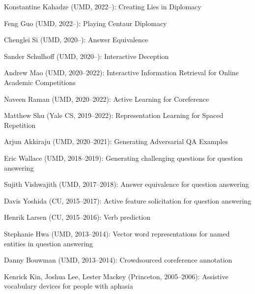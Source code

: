  {

  \begin{enumerate*}
    \item Konstantine Kahadze (UMD, 2022--): Creating Lies in Diplomacy
    \item Feng Guo (UMD, 2022--): Playing Centaur Diplomacy
  \item Chenglei Si (UMD, 2020--): Answer Equivalence
    \item Sander Schulhoff (UMD, 2020--): Interactive Deception          
    \item Andrew Mao (UMD, 2020--2022): Interactive Information Retrieval
      for Online Academic Competitions      
    \item Naveen Raman (UMD, 2020--2022): Active Learning for Coreference
    \item Matthew Shu (Yale CS, 2019--2022): Representation Learning
      for Spaced Repetition
    \item Arjun Akkiraju (UMD, 2020--2021): Generating Adversarial QA Examples      
  \item Eric Wallace (UMD, 2018--2019): Generating challenging questions for
    question answering
  \item Sujith Vishwajith (UMD, 2017--2018): Answer equivalence for question answering
  \item Davis Yoshida (CU, 2015--2017): Active feature solicitation for question answering
  \item Henrik Larsen (CU, 2015--2016): Verb prediction
  \item Stephanie Hwa (UMD, 2013--2014): Vector word representations for named entities in question answering
  \item Danny Bouwman (UMD, 2013--2014): Crowdsourced coreference annotation
  \item Kenrick Kin, Joshua Lee, Lester Mackey (Princeton, 2005--2006): Assistive vocabulary devices
    for people with aphasia
\end{enumerate*}
}

